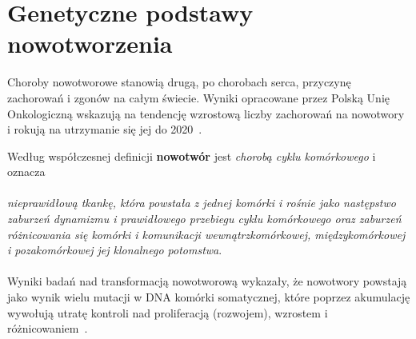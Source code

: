 \section{Genetyczne podstawy nowotworzenia}\label{cha:gen}
Choroby nowotworowe stanowią drugą, po chorobach serca, przyczynę zachorowań i zgonów na całym świecie. Wyniki opracowane przez Polską Unię Onkologiczną wskazują na tendencję wzrostową liczby zachorowań na nowotwory i rokują na utrzymanie się jej do 2020~\cite{zikula}.

Według współczesnej definicji \textbf{nowotwór} jest \textit{chorobą cyklu komórkowego} i oznacza \cite{zikula2} \\ \ \\ \textit{nieprawidłową tkankę, która powstała z jednej komórki i rośnie jako następstwo zaburzeń dynamizmu i prawidłowego przebiegu cyklu komórkowego oraz zaburzeń różnicowania się komórki i komunikacji wewnątrzkomórkowej, międzykomórkowej i pozakomórkowej jej klonalnego potomstwa}. \\ \ \\
Wyniki badań nad transformacją nowotworową wykazały, że nowotwory powstają jako wynik wielu mutacji w DNA komórki somatycznej, które poprzez akumulację wywołują utratę kontroli nad proliferacją (rozwojem), wzrostem i różnicowaniem~\cite{zikula5}.

